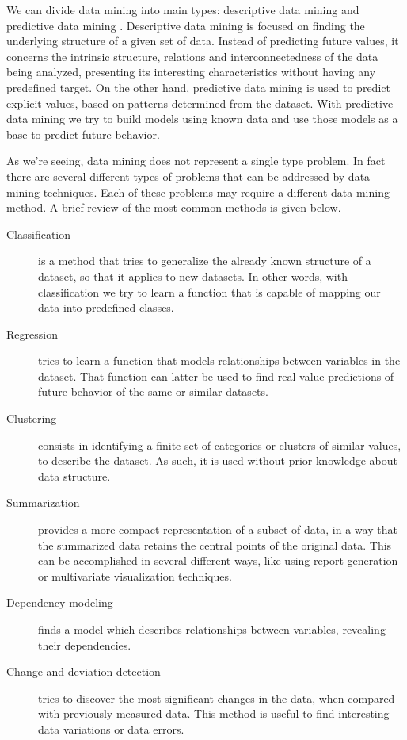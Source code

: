 We can divide data mining into main types: descriptive data mining and
predictive data mining \cite{Fayyad1996}. Descriptive data mining is focused on
finding the underlying structure of a given set of data. Instead of predicting
future values, it concerns the intrinsic structure, relations and
interconnectedness of the data being analyzed, presenting its interesting
characteristics without having any predefined target. On the other hand,
predictive data mining is used to predict explicit values, based on patterns
determined from the dataset. With predictive data mining we try to build models
using known data and use those models as a base to predict future behavior.

As we're seeing, data mining does not represent a single type problem. In fact
there are several different types of problems that can be addressed by data
mining techniques. Each of these problems may require a different data mining
method. A brief review of the most common methods is given below.

\begin{description}

  \item[Classification]
  is a method that tries to generalize the already known structure of a
  dataset, so that it applies to new datasets. In other words, with
  classification we try to learn a function that is capable of mapping our data
  into predefined classes.

  \item[Regression]
  tries to learn a function that models relationships between variables in the
  dataset. That function can latter be used to find real value predictions of
  future behavior of the same or similar datasets.

  \item[Clustering]
  consists in identifying a finite set of categories or clusters of similar
  values, to describe the dataset. As such, it is used without prior knowledge
  about data structure.

  \item[Summarization]
  provides a more compact representation of a subset of data, in a way that the
  summarized data retains the central points of the original data. This can be
  accomplished in several different ways, like using report generation or
  multivariate visualization techniques.

  \item[Dependency modeling]
  finds a model which describes relationships between variables, revealing their
  dependencies.

  \item[Change and deviation detection]
  tries to discover the most significant changes in the data, when compared with
  previously measured data. This method is useful to find interesting data
  variations or data errors.

\end{description}

